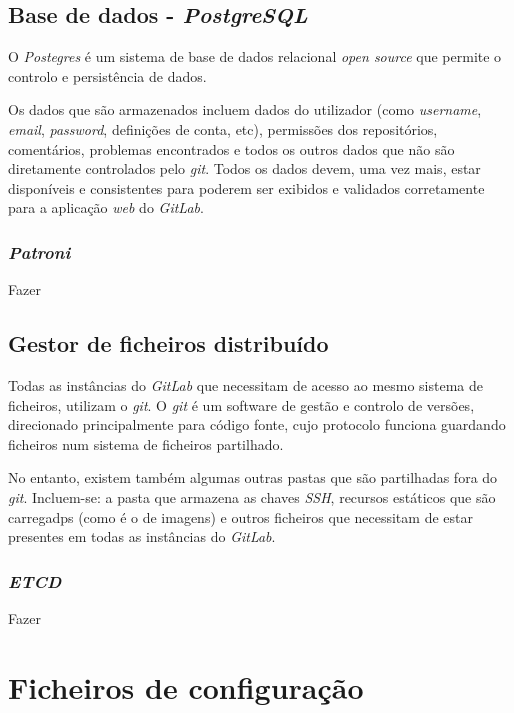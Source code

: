 \documentclass[12pt,a4paper]{article}
\begin{document}
\subsection{Base de dados - \emph{PostgreSQL}}
O \emph{Postegres} é um sistema de base de dados relacional \emph{open source} que permite o controlo e  persistência de dados.

Os dados que são armazenados incluem dados do utilizador (como \emph{username}, \emph{email}, \emph{password}, definições de conta, etc), permissões dos repositórios, comentários, problemas encontrados e todos os outros dados que não são diretamente controlados pelo \emph{git}. Todos os dados devem, uma vez mais, estar disponíveis e consistentes para poderem ser exibidos e validados corretamente para a aplicação \emph{web} do \emph{GitLab}.


\subsubsection{\emph{Patroni}}

Fazer


\subsection{Gestor de ficheiros distribuído}
Todas as instâncias do \emph{GitLab} que necessitam de acesso ao mesmo sistema de ficheiros, utilizam o \emph{git}. O \emph{git} é um software de gestão e controlo de versões, direcionado principalmente para código fonte, cujo protocolo funciona guardando ficheiros num sistema de ficheiros partilhado.

No entanto, existem também algumas outras pastas que são partilhadas fora do \emph{git}. Incluem-se: a pasta que armazena as chaves \emph{SSH}, recursos estáticos que são carregadps (como é o de imagens) e outros ficheiros que necessitam de estar presentes em todas as instâncias do \emph{GitLab}.


\subsubsection{\emph{ETCD}}

Fazer








\newpage
\section{Ficheiros de configuração}
\end{document}
